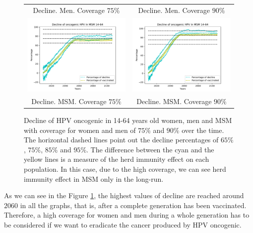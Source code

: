 \begin{figure}[!]
\begin{tabular}{cc}
		Decline. Men. Coverage $75\%$	& Decline. Men. Coverage $90\%$ \\ 		
		\includegraphics[width=0.5\linewidth]{IMGs/9.-Erradicacion_ONCO/onco_MSM_75.pdf}	& 
		\includegraphics[width=0.5\linewidth]{IMGs/9.-Erradicacion_ONCO/onco_MSM_90.pdf}  \\ 
		Decline. MSM. Coverage $75\%$	& Decline. MSM. Coverage $90\%$
	\end{tabular} 
	\caption{Decline of HPV oncogenic in 14-64 years old women, men and MSM with coverage for women and men of $75\%$ and $90\%$ over the time. The horizontal dashed lines point out the decline percentages of $65\%$, $75\%$, $85\%$ and $95\%$. The difference between the cyan and the yellow lines is a measure of the herd immunity effect on each population. In this case, due to the high coverage, we can see herd immunity effect in MSM only in the long-run.}
	\label{fig:erradicacion}
\end{figure}

As we can see in the Figure \ref{fig:erradicacion}, the highest values of decline are reached around $2060$ in all the graphs, that is, after a complete generation has been vaccinated. Therefore, a high coverage for women and men during a whole generation has to be considered if we want to eradicate the cancer produced by HPV oncogenic. 

